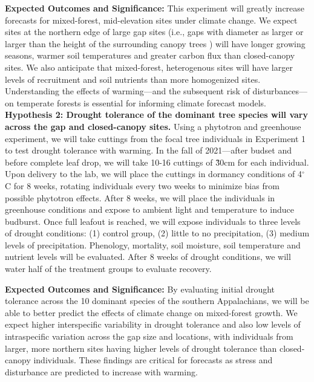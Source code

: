 \documentclass[11pt]{article}\usepackage[]{graphicx}\usepackage[]{color}
\begin{document}
\textbf{Expected Outcomes and Significance:} This experiment will greatly increase forecasts for mixed-forest, mid-elevation sites under climate change. We expect sites at the northern edge of large gap sites (i.e., gaps with diameter as larger or larger than the height of the surrounding canopy trees \citep{Raymond2006}) will have longer growing seasons, warmer soil temperatures and greater carbon flux than closed-canopy sites. We also anticipate that mixed-forest, heterogenous sites will have larger levels of recruitment and soil nutrients than more homogenized sites. Understanding the effects of warming---and the subsequent risk of disturbances---on temperate forests is essential for informing climate forecast models. \\

{ \textbf{Hypothesis 2: Drought tolerance of the dominant tree species will vary across the gap and closed-canopy sites.}} Using a phytotron and greenhouse experiment, we will take cuttings from the focal tree individuals in Experiment 1 to test drought tolerance with warming. In the fall of 2021---after budset and before complete leaf drop, we will take 10-16 cuttings of \~30cm for each individual. Upon delivery to the lab, we will place the cuttings in dormancy conditions of 4$^\circ{}$C for 8 weeks, rotating individuals every two weeks to minimize bias from possible phytotron effects. After 8 weeks, we will place the individuals in greenhouse conditions and expose to ambient light and temperature to induce budburst. Once full leafout is reached, we will expose individuals to three levels of drought conditions: (1) control group, (2) little to no precipitation, (3) medium levels of precipitation.  Phenology, mortality, soil moisture, soil temperature and nutrient levels will be evaluated. After 8 weeks of drought conditions, we will water half of the treatment groups to evaluate recovery. 

  
\textbf{Expected Outcomes and Significance:} By evaluating initial drought tolerance across the 10 dominant species of the southern Appalachians, we will be able to better predict the effects of climate change on mixed-forest growth.  We expect higher interspecific variability in drought tolerance and also low levels of intraspecific variation across the gap size and locations, with individuals from larger, more northern sites having higher levels of drought tolerance than closed-canopy individuals. These findings are critical for forecasts as stress and disturbance are predicted to increase with warming. \\
\end{document}

